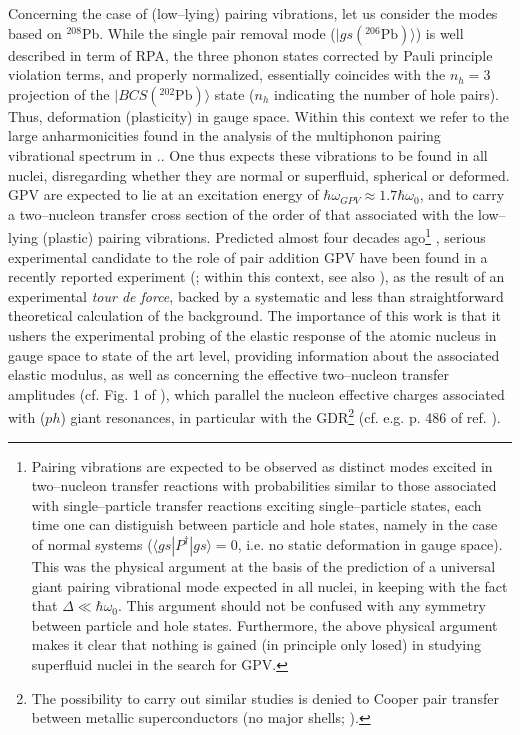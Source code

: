 \documentclass[a4paper,11pt]{article}
\numberwithin{equation}{section}
\numberwithin{figure}{section}
\numberwithin{table}{section}
\newcommand{\braket}[1]{\langle {#1} \rangle }
\newcommand{\ket}[1]{|{#1} \rangle }
\begin{document}
{	Concerning the case of (low--lying) pairing vibrations, let us consider the modes based on $^{208}$Pb. While the single pair removal mode ($\ket{gs (^{206}\text{Pb})}$) is well described in term of RPA, the three phonon states corrected by Pauli principle violation terms, and properly normalized, essentially coincides with the $n_h=3$ projection of the $\ket{BCS (^{202}\text{Pb})}$ state ($n_h$ indicating the number of hole pairs). Thus, deformation (plasticity) in gauge space. Within this context we refer to the large anharmonicities found in the analysis of the multiphonon pairing vibrational spectrum in \cite{Clark:06}.}. One  thus expects these vibrations to be found in all nuclei, disregarding whether they are normal or superfluid, spherical or deformed. GPV are expected to lie at an excitation energy of $\hbar\omega_{GPV}\approx 1.7 \hbar\omega_0$, and to carry a two--nucleon transfer cross section of the order of that associated with the low--lying (plastic) pairing vibrations. Predicted almost four decades ago\footnote{Pairing vibrations are expected to be observed as distinct modes excited in two--nucleon transfer reactions with probabilities similar to those associated with single--particle transfer reactions exciting single--particle states, each time one can distiguish between particle and hole states, namely in the case of normal systems ($\braket{gs|P^\dagger|gs}=0$, i.e. no static deformation in gauge space). This was the physical argument at the basis of the prediction of a universal giant pairing vibrational mode expected in all nuclei, in keeping with the fact that $\Delta\ll\hbar\omega_0$. This argument should not be confused with any symmetry between particle and hole states. Furthermore, the above physical argument makes it clear that nothing is gained (in principle only losed) in studying superfluid nuclei in the search for GPV.} \cite{Broglia:77}, serious experimental candidate to the role of pair addition GPV have been found in a recently reported experiment (\cite{Cappuzzello:15}; within this context, see also  \cite{Crawley:77,Crawley:80,Mouginot:11}), as the result of an experimental \textit{tour de force}, backed by a systematic and less than straightforward theoretical calculation of the background. The importance of this work is that it ushers the experimental probing of the elastic response of the atomic nucleus in gauge space to state of the art level, providing information about the associated elastic modulus, as well as concerning the effective two--nucleon transfer amplitudes (cf. Fig. 1 of \cite{Broglia:77}), which  parallel  the nucleon effective charges associated with ($ph$) giant resonances, in particular with the GDR\footnote{The possibility to carry out similar studies is denied to Cooper pair  transfer between metallic superconductors (no major shells; \cite{Josephson:62}).} (cf. e.g. p. 486 of ref. \cite{Bohr:75}).
\end{document}
